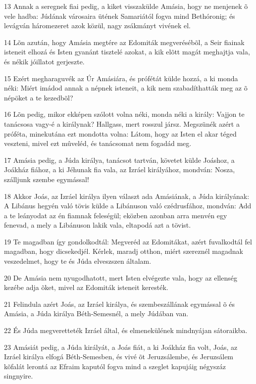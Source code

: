 \par 13 Annak a seregnek fiai pedig, a kiket visszakülde Amásia, hogy ne menjenek õ vele hadba: Júdának városaira ütének Samariától fogva mind Bethóronig; és levágván háromezeret azok közül, nagy zsákmányt vivének el.
\par 14 Lõn azután, hogy Amásia megtére az Edomiták megverésébõl, a Seir fiainak isteneit elhozá  és Isten gyanánt tisztelé azokat, a kik elõtt magát meghajtja vala, és nékik jóillatot gerjeszte.
\par 15 Ezért megharaguvék az Úr Amásiára, és prófétát külde hozzá, a ki monda néki: Miért imádod annak a népnek isteneit, a kik nem szabadíthatták meg az õ népöket a te kezedbõl?
\par 16 Lõn pedig, mikor ekképen szólott volna néki, monda néki a király: Vajjon te tanácsosa vagy-é a királynak? Hallgass, mert rosszul jársz. Megszünék azért a próféta, minekutána ezt mondotta volna: Látom, hogy az Isten el akar téged veszteni,  mivel ezt mûveléd, és tanácsomat nem fogadád meg.
\par 17 Amásia pedig, a Júda királya, tanácsot tartván, követet külde Joáshoz, a Joákház fiához, a ki Jéhunak fia vala, az Izráel királyához, mondván: Nosza, szálljunk szembe egymással!
\par 18 Akkor Joás, az Izráel királya ilyen választ ada Amásiának, a Júda királyának: A Libánus hegyén való tövis külde a Libánuson való czédrusfához, mondván: Add a te leányodat az én fiamnak feleségül; eközben azonban arra menvén egy fenevad, a mely a Libánuson lakik vala, eltapodá azt a tövist.
\par 19 Te magadban így gondolkodtál: Megveréd az Edomitákat, azért fuvalkodtál fel magadban, hogy dicsekedjél. Kérlek, maradj otthon, miért szereznél magadnak veszedelmet, hogy te és Júda elveszszen általam.
\par 20 De Amásia nem nyugodhatott, mert Isten elvégezte vala, hogy az ellenség kezébe adja õket, mivel az Edomiták isteneit keresték.
\par 21 Felindula azért Joás, az Izráel királya, és szembeszállának egymással õ és Amásia, a Júda királya Béth-Semesnél, a mely Júdában van.
\par 22 És Júda megveretteték Izráel által, és elmenekülének mindnyájan sátoraikba.
\par 23 Amásiát pedig, a Júda királyát, a Joás fiát, a ki Joákház fia volt, Joás, az Izráel királya elfogá Béth-Semesben, és vivé õt Jeruzsálembe, és Jeruzsálem kõfalát lerontá az Efraim kaputól fogva mind a szeglet kapujáig négyszáz singnyire.
